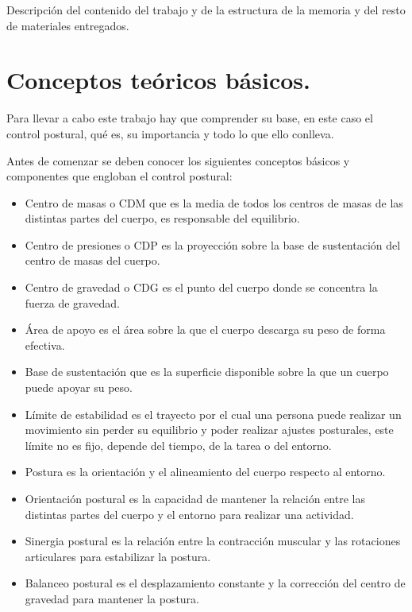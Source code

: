 
Descripción del contenido del trabajo y de la estructura de la memoria y del resto de materiales entregados.


\section{Conceptos teóricos básicos.} %
Para llevar a cabo este trabajo hay que comprender su base, en este caso el control postural, qué es, su importancia y todo lo que ello conlleva.\cite{wiki:latex} %

Antes de comenzar se deben conocer los siguientes conceptos básicos y componentes que engloban el control postural:

\begin{itemize}
    \item Centro de masas o CDM que es la media de todos los centros de masas de las distintas partes del cuerpo, es responsable del equilibrio.
    \item Centro de presiones o CDP es la proyección sobre la base de sustentación del centro de masas del cuerpo.
    \item Centro de gravedad o CDG es el punto del cuerpo donde se concentra la fuerza de gravedad.
    \item Área de apoyo es el área sobre la que el cuerpo descarga su peso de forma efectiva.
    \item Base de sustentación que es la superficie disponible sobre la que un cuerpo puede apoyar su peso.
    \item Límite de estabilidad es el trayecto por el cual una persona puede realizar un movimiento sin perder su equilibrio y poder realizar ajustes posturales, este límite no es fijo, depende del tiempo, de la tarea o del entorno.
    \item Postura es la orientación y el alineamiento del cuerpo respecto al entorno.
    \item Orientación postural es la capacidad de mantener la relación entre las distintas partes del cuerpo y el entorno para realizar una actividad.
    \item Sinergia postural es la relación entre la contracción muscular y las rotaciones articulares para estabilizar la postura.
    \item Balanceo postural es el desplazamiento constante y la corrección del centro de gravedad para mantener la postura.
\end{itemize}


